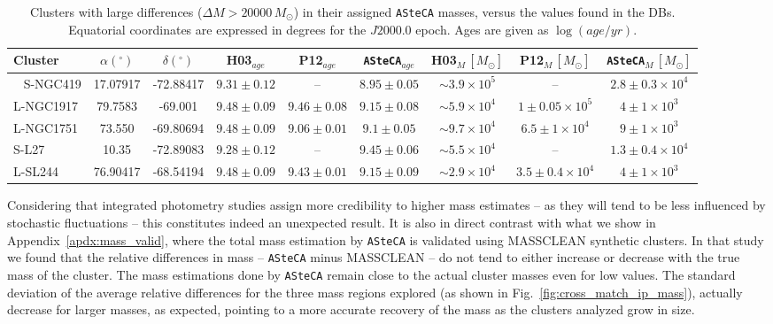\documentclass{aa}
\begin{document}
%
\begin{table*}
\centering
\caption{Clusters with large differences ($\Delta M{>}20000\,M_{\odot}$) in
their assigned \texttt{ASteCA} masses, versus the values found in the DBs.
Equatorial coordinates are expressed in degrees for the $J2000.0$ epoch.
Ages are given as $\log(age/yr)$.}
\label{tab:integ_phot_masses}
\begin{tabular}{lcccccccc}
\hline\hline
Cluster & $\alpha(^\circ)$ & $\delta(^\circ)$ & H03$_{age}$ &
P12$_{age}$ & \texttt{ASteCA}$_{age}$ &
H03$_{M}\,[M_{\odot}]$ &
P12$_{M}\,[M_{\odot}]$ & \texttt{ASteCA}$_{M}\,[M_{\odot}]$\\
\hline\
%
S-NGC419 & 17.07917 & -72.88417 & $9.31{\pm}0.12$ & -- & $8.95{\pm}0.05$ &
$\sim3.9{\times}10^{5}$ & -- & $2.8{\pm}0.3{\times}10^{4}$\\
%
L-NGC1917 & 79.7583 & -69.001 & $9.48{\pm}0.09$ & $9.46{\pm}0.08$ & $9.15{\pm}0.08$ &
$\sim5.9{\times}10^{4}$ & $1{\pm}0.05{\times}10^{5}$ & $4{\pm}1{\times}10^{3}$\\
%
L-NGC1751 & 73.550 & -69.80694 & $9.48{\pm}0.09$ & $9.06{\pm}0.01$ & $9.1{\pm}0.05$ &
$\sim9.7{\times}10^{4}$ & $6.5{\pm}1{\times}10^{4}$ & $9{\pm}1{\times}10^{3}$\\
%
S-L27 & 10.35 & -72.89083 & $9.28{\pm}0.12$ & -- & $9.45{\pm}0.06$ &
$\sim5.5{\times}10^{4}$ & -- & $1.3{\pm}0.4{\times}10^{4}$\\
%
L-SL244 & 76.90417 & -68.54194 & $9.48{\pm}0.09$ & $9.43{\pm}0.01$ & $9.15{\pm}0.09$ &
$\sim2.9{\times}10^{4}$ & $3.5{\pm}0.4{\times}10^{4}$ & $4{\pm}1{\times}10^{3}$\\
\hline   
\end{tabular}
\end{table*}

Considering that integrated photometry studies assign more credibility to higher
mass estimates -- as they will tend to be less influenced by stochastic
fluctuations -- this constitutes indeed an unexpected result.
%
It is also in direct contrast with what we show in
Appendix~\ref{apdx:mass_valid}, where the total mass estimation by
\texttt{ASteCA} is validated using MASSCLEAN synthetic clusters. In that study
we found that the relative differences in mass -- \texttt{ASteCA} minus
MASSCLEAN -- do not tend to either increase or decrease with the true mass of
the cluster. The mass estimations done by \texttt{ASteCA} remain close to the
actual cluster masses even for low values. The standard deviation of the
average relative differences for the three mass regions explored (as shown in
Fig.~\ref{fig:cross_match_ip_mass}), actually decrease for larger masses, as
expected, pointing to a more accurate recovery of the mass as the clusters
analyzed grow in size.\\
\end{document}
